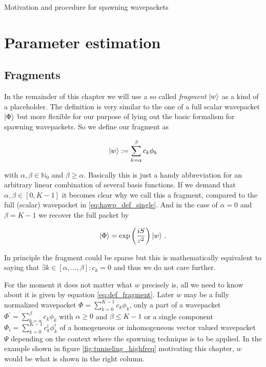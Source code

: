 \begin{chapter}{Motivation and procedure for spawning wavepackets}
\section{Parameter estimation}
\label{sec:parameter_estimation}

\subsection{Fragments}

In the remainder of this chapter we will use a so called \emph{fragment} $\Ket{w}$ as a
kind of a placeholder. The definition is very similar to the one of a full scalar
wavepacket $\Ket{\Phi}$ but more flexible for our purpose of lying out the basic
formalism for spawning wavepackets. So we define our fragment as

\begin{equation} \label{eq:def_fragment}
  \Ket{w} := \sum_{k=\alpha}^\beta c_k \phi_k
\end{equation}

with $\alpha, \beta \in \mathbb{N}_0$ and $\beta \geq \alpha$. Basically this is
just a handy abbreviation for an arbitrary linear combination of several basis functions.
If we demand that $\alpha,\beta \in \left[0, K-1\right]$ it becomes clear why we
call this a fragment, compared to the full (scalar) wavepacket in \eqref{eq:hawp_def_single}.
And in the case of $\alpha=0$ and $\beta=K-1$ we recover the full packet by

\begin{equation}
  \Ket{\Phi} = \exp\left( \frac{iS}{\varepsilon^2} \right) \Ket{w} \,.
\end{equation}

In principle the fragment could be sparse but this is mathematically equivalent
to saying that $\exists k \in \left[\alpha, \ldots, \beta\right] : c_k = 0$ and
thus we do not care further.

For the moment it does not matter what $w$ precisely is, all we need to know about
it is given by equation \eqref{eq:def_fragment}. Later $w$ may be a fully normalized
wavepacket $\Phi = \sum_{k=0}^{K-1} c_k \phi_k$, only a part of a wavepacket
$\Phi^\prime = \sum_{k=\alpha}^{\beta} c_k \phi_k$ with $\alpha \geq 0$ and
$\beta \leq K-1$ or a single component $\Phi_i = \sum_{k=0}^{K-1} c_k^i \phi_k^i$
of a homogeneous or inhomogeneous vector valued wavepacket $\Psi$ depending
on the context where the spawning technique is to be applied.  In the example
shown in figure \eqref{fig:tunneling_highfreq} motivating this chapter, $w$ would
be what is shown in the right column.


\end{chapter}
